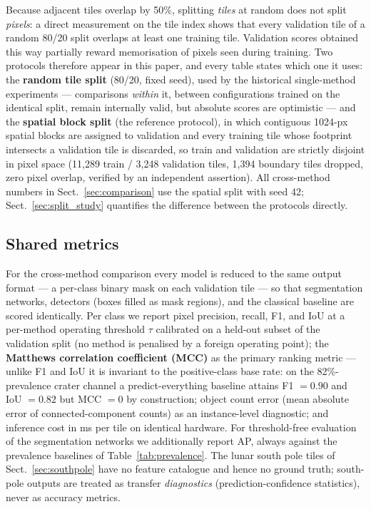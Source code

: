 \documentclass{aa}
\begin{document}
Because adjacent tiles overlap by 50\%, splitting \emph{tiles} at random does not split \emph{pixels}: a direct measurement on the tile index shows that every validation tile of a random 80/20 split overlaps at least one training tile. Validation scores obtained this way partially reward memorisation of pixels seen during training. Two protocols therefore appear in this paper, and every table states which one it uses: the \textbf{random tile split} (80/20, fixed seed), used by the historical single-method experiments --- comparisons \emph{within} it, between configurations trained on the identical split, remain internally valid, but absolute scores are optimistic --- and the \textbf{spatial block split} (the reference protocol), in which contiguous 1024-px spatial blocks are assigned to validation and every training tile whose footprint intersects a validation tile is discarded, so train and validation are strictly disjoint in pixel space (11{,}289 train / 3{,}248 validation tiles, 1{,}394 boundary tiles dropped, zero pixel overlap, verified by an independent assertion). All cross-method numbers in Sect.~\ref{sec:comparison} use the spatial split with seed 42; Sect.~\ref{sec:split_study} quantifies the difference between the protocols directly.

\subsection{Shared metrics}
\label{sec:metrics_protocol}

For the cross-method comparison every model is reduced to the same output format --- a per-class binary mask on each validation tile --- so that segmentation networks, detectors (boxes filled as mask regions), and the classical baseline are scored identically. Per class we report pixel precision, recall, F1, and IoU at a per-method operating threshold $\tau$ calibrated on a held-out subset of the validation split (no method is penalised by a foreign operating point); the \textbf{Matthews correlation coefficient (MCC)} as the primary ranking metric --- unlike F1 and IoU it is invariant to the positive-class base rate: on the 82\%-prevalence crater channel a predict-everything baseline attains F1 $=0.90$ and IoU $=0.82$ but MCC $=0$ by construction; object count error (mean absolute error of connected-component counts) as an instance-level diagnostic; and inference cost in ms per tile on identical hardware. For threshold-free evaluation of the segmentation networks we additionally report AP, always against the prevalence baselines of Table~\ref{tab:prevalence}. The lunar south pole tiles of Sect.~\ref{sec:southpole} have no feature catalogue and hence no ground truth; south-pole outputs are treated as transfer \emph{diagnostics} (prediction-confidence statistics), never as accuracy metrics.
\end{document}

